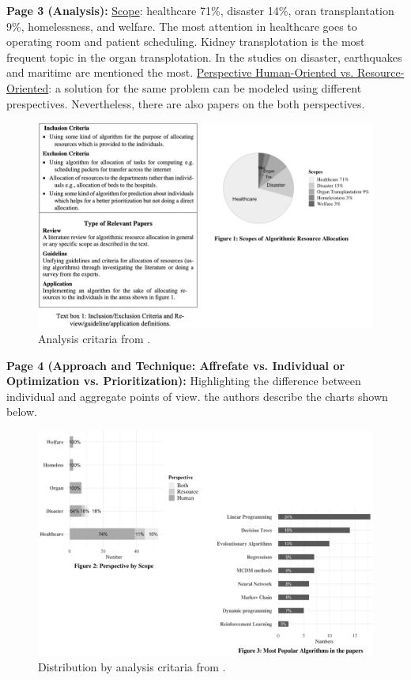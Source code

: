     \textbf{Page 3 (Analysis):}
    \underline{Scope}: healthcare 71\%, disaster 14\%, oran transplantation 9\%, homelessness, and welfare. The most attention in healthcare goes to operating room and patient scheduling. Kidney transplotation is the most frequent topic in the organ transplotation. In the studies on disaster, earthquakes and maritime are mentioned the most. \underline{Perspective Human-Oriented vs. Resource-Oriented}: a solution for the same problem can be modeled using different prespectives. Nevertheless, there are also papers on the both perspectives.
    \begin{figure}[H]
        \centering
        \includegraphics[width=1\textwidth]{figures/AR0017GB23/fig2.png}
        \caption{Analysis critaria from \cite{x121}.}
        \label{fig2:AR0017GB23}
    \end{figure}

    \textbf{Page 4 (Approach and Technique: Affrefate vs. Individual or Optimization vs. Prioritization):}
    Highlighting the difference between individual and aggregate points of view. the authors describe the charts shown below.
    \begin{figure}[H]
        \centering
        \includegraphics[width=1\textwidth]{figures/AR0017GB23/fig3.png}
        \caption{Distribution by analysis critaria from \cite{x121}.}
        \label{fig3:AR0017GB23}
    \end{figure}

